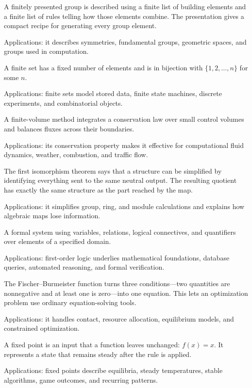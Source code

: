 A finitely presented group is described using a finite list of building elements and a finite list of rules telling how those elements combine. The presentation gives a compact recipe for generating every group element. \par\noindent Applications: it describes symmetries, fundamental groups, geometric spaces, and groups used in computation.

A finite set has a fixed number of elements and is in bijection with $\{1,2,\ldots,n\}$ for some $n$. \par\noindent Applications: finite sets model stored data, finite state machines, discrete experiments, and combinatorial objects.

A finite-volume method integrates a conservation law over small control volumes and balances fluxes across their boundaries. \par\noindent Applications: its conservation property makes it effective for computational fluid dynamics, weather, combustion, and traffic flow.

The first isomorphism theorem says that a structure can be simplified by identifying everything sent to the same neutral output. The resulting quotient has exactly the same structure as the part reached by the map. \par\noindent Applications: it simplifies group, ring, and module calculations and explains how algebraic maps lose information.

A formal system using variables, relations, logical connectives, and quantifiers over elements of a specified domain. \par\noindent Applications: first-order logic underlies mathematical foundations, database queries, automated reasoning, and formal verification.

The Fischer--Burmeister function turns three conditions—two quantities are nonnegative and at least one is zero—into one equation. This lets an optimization problem use ordinary equation-solving tools. \par\noindent Applications: it handles contact, resource allocation, equilibrium models, and constrained optimization.

A fixed point is an input that a function leaves unchanged: $f(x)=x$. It represents a state that remains steady after the rule is applied. \par\noindent Applications: fixed points describe equilibria, steady temperatures, stable algorithms, game outcomes, and recurring patterns.


